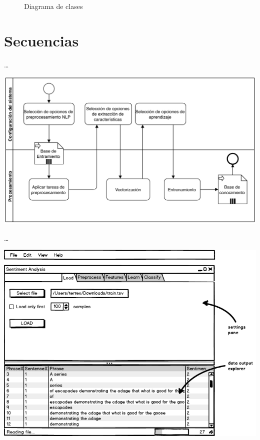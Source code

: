 \begin{landscape}
\begin{figure}[htbp]
\centering
\resizebox{!}{0.99\textwidth}{}
\caption{Diagrama de clases}
\label{fig:classes}
\end{figure}
\end{landscape}



\section{Secuencias}




\resizebox{0.5\textwidth}{!}{}

\ldots

\includegraphics[width=\textwidth]{bpmn-entrenamiento}

\ldots

\includegraphics[width=14cm]{gui-1-load}

